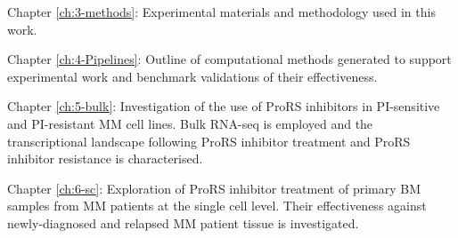 \noindent
Chapter \ref{ch:3-methods}: Experimental materials and methodology used in this work.

\noindent
Chapter \ref{ch:4-Pipelines}: Outline of computational methods generated to support experimental work and benchmark validations of their effectiveness.

\noindent
Chapter \ref{ch:5-bulk}: Investigation of the use of ProRS inhibitors in PI-sensitive and PI-resistant MM cell lines.
Bulk RNA-seq is employed and the transcriptional landscape following ProRS inhibitor treatment and ProRS inhibitor resistance is characterised.

\noindent
Chapter \ref{ch:6-sc}: Exploration of ProRS inhibitor treatment of primary BM samples from MM patients at the single cell level.
Their effectiveness against newly-diagnosed and relapsed MM patient tissue is investigated.
